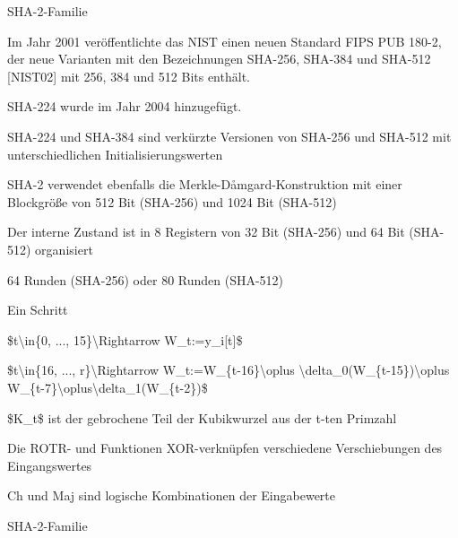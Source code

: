 \documentclass[a4paper]{article}
\begin{document}
\begin{multicols}{3}
\begin{itemize*}
\begin{itemize*}
            \end{itemize*}
            \item SHA-2-Familie
            \begin{itemize*}
                  \item Im Jahr 2001 veröffentlichte das NIST einen neuen Standard FIPS PUB 180-2, der neue Varianten mit den Bezeichnungen SHA-256, SHA-384 und SHA-512 {[}NIST02{]} mit 256, 384 und 512 Bits enthält.
                  \begin{itemize*} \item SHA-224 wurde im Jahr 2004 hinzugefügt. \end{itemize*}
                  \item SHA-224 und SHA-384 sind verkürzte Versionen von SHA-256 und SHA-512 mit unterschiedlichen Initialisierungswerten
                  \item SHA-2 verwendet ebenfalls die Merkle-Dåmgard-Konstruktion mit einer Blockgröße von 512 Bit (SHA-256) und 1024 Bit (SHA-512)
                  \item Der interne Zustand ist in 8 Registern von 32 Bit (SHA-256) und 64 Bit (SHA-512) organisiert
                  \item 64 Runden (SHA-256) oder 80 Runden (SHA-512)
            \end{itemize*}
            \item Ein Schritt
            \begin{itemize*}
                  \item \$t\textbackslash in\{0, ..., 15\}\textbackslash Rightarrow W\_t:=y\_i{[}t{]}\$
                  \item \$t\textbackslash in\{16, ..., r\}\textbackslash Rightarrow W\_t:=W\_\{t-16\}\textbackslash oplus \textbackslash delta\_0(W\_\{t-15\})\textbackslash oplus W\_\{t-7\}\textbackslash oplus\textbackslash delta\_1(W\_\{t-2\})\$
                  \item \$K\_t\$ ist der gebrochene Teil der Kubikwurzel aus der t-ten Primzahl
                  \item Die ROTR- und Funktionen XOR-verknüpfen verschiedene Verschiebungen des Eingangswertes
                  \item Ch und Maj sind logische Kombinationen der Eingabewerte
            \end{itemize*}
            \item SHA-2-Familie

\end{itemize*}
\end{multicols}
\end{document}
